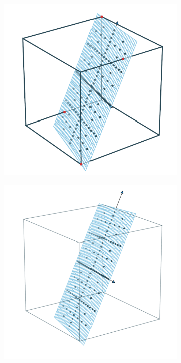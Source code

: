 \documentclass[
  a4paper,  %
  twoside,  %
  bibliography=totoc,
  headsepline,
  cleardoublepage=empty,
  parskip=half,
  draft=false
]{scrbook}
\begin{document}
\begin{mdframed}[style=style]
\vspace{2.5mm}
\begin{figure}[H]
\begin{subfigure}{.5\textwidth}
  \centering
  \includegraphics[width=\linewidth]{graphics/surrogate_vis_1}
\end{subfigure}%
\begin{subfigure}{.5\textwidth}
  \centering
  \includegraphics[width=\linewidth]{graphics/surrogate_vis_2}

\end{subfigure}
\end{figure}
\end{mdframed}
\end{document}
